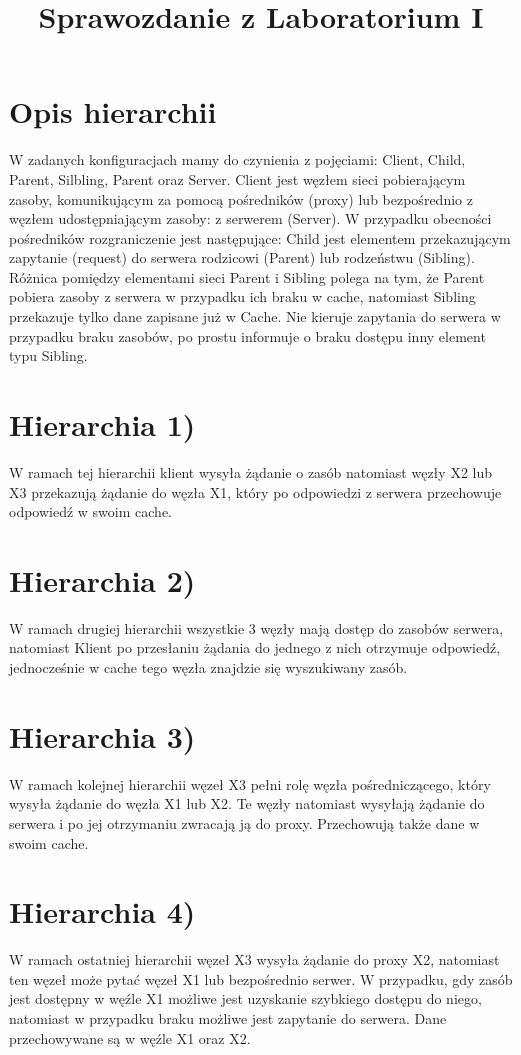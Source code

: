 \documentclass{article}
\title{Sprawozdanie z Laboratorium I}
\begin{document}
\maketitle
\section{Opis hierarchii}
W zadanych konfiguracjach mamy do czynienia z pojęciami: Client, Child, Parent, Silbling, Parent oraz Server.
Client jest węzłem sieci pobierającym zasoby, komunikującym za pomocą pośredników (proxy) lub bezpośrednio z węzłem udostępniającym zasoby: z serwerem (Server). 
W przypadku obecności pośredników rozgraniczenie jest następujące: Child jest elementem przekazującym zapytanie (request) do serwera rodzicowi (Parent) lub rodzeństwu (Sibling). Różnica pomiędzy elementami sieci Parent i Sibling polega na tym, że Parent pobiera zasoby z serwera w przypadku ich braku w cache, natomiast Sibling przekazuje tylko dane zapisane już w Cache. Nie kieruje zapytania do serwera w przypadku braku zasobów, po prostu informuje o braku dostępu inny element typu Sibling.
\section{Hierarchia 1)}
W ramach tej hierarchii klient wysyła żądanie o zasób natomiast węzły X2 lub X3 przekazują żądanie do węzła X1, który po odpowiedzi z serwera przechowuje odpowiedź w swoim cache.
\section{Hierarchia 2)}
W ramach drugiej hierarchii wszystkie 3 węzły mają dostęp do zasobów serwera, natomiast Klient po przesłaniu żądania do jednego z nich otrzymuje odpowiedź, jednocześnie w cache tego węzła znajdzie się wyszukiwany zasób.
\section{Hierarchia 3)}
W ramach kolejnej hierarchii węzeł X3 pełni rolę węzła pośredniczącego, który wysyła żądanie do węzła X1 lub X2. Te węzły natomiast wysyłają żądanie do serwera i po jej otrzymaniu zwracają ją do proxy. Przechowują także dane w swoim cache.
\section{Hierarchia 4)}
W ramach ostatniej hierarchii węzeł X3 wysyła żądanie do proxy X2, natomiast ten węzeł może pytać węzeł X1 lub bezpośrednio serwer. W przypadku, gdy zasób jest dostępny w węźle X1 możliwe jest uzyskanie szybkiego dostępu do niego, natomiast w przypadku braku możliwe jest zapytanie do serwera. Dane przechowywane są w węźle X1 oraz X2.
\end{document}
